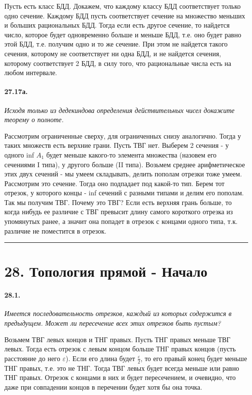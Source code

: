 \documentclass{book}
\begin{document}
Пусть есть класс БДД. Докажем, что каждому классу БДД соответствует только одно сечение. Каждому БДД пусть соответствует сечение на множество меньших и больших рациональных БДД. Тогда если есть другое сечение, то найдется число, которое будет одновременно больше и меньше БДД, т.е. оно будет равно этой БДД, т.е. получим одно и то же сечение. При этом не найдется такого сечения, которому не соответствует ни одна БДД, и не найдется сечения, которому соответствует 2 БДД, в силу того, что рациональные числа есть на любом интервале.


\paragraph{27.17а.}
\textit{Исходя только из дедекиндова определения действительных чисел докажите теорему о полноте.}

Рассмотрим ограниченные сверху, для ограниченных снизу аналогично. Тогда у таких множеств есть верхние грани. Пусть ТВГ нет. Выберем 2 сечения - у одного inf $A_1$ будет меньше какого-то элемента множества (назовем его сечениями I типа), у другого больше (II типа). Возьмем среднее арифметическое этих двух сечений - мы умеем складывать, делить пополам отрезки тоже умеем. Рассмотрим это сечение. Тогда оно подпадает под какой-то тип. Берем тот отрезок, у которого концы - inf сечений с разными типами и делим его пополам. Так мы получим ТВГ. Почему это ТВГ? Если есть верхняя грань больше, то когда нибудь ее различие с ТВГ превысит длину самого короткого отрезка  из упомянутых ранее, а значит она попадет в отрезок с концами одного типа, т.к. различие не поместится в отрезок.

\medskip\hrule\medskip


\section*{28. Топология прямой - Начало}

\paragraph{28.1.}
\textit{Имеется последовательность отрезков, каждый из которых содержится в предыдущем. Может ли пересечение всех этих отрезков быть пустым?}

Возьмем ТВГ левых концов и ТНГ правых. Пусть ТНГ правых меньше ТВГ левых. Тогда есть отрезок с левым концом больше ТНГ правых концов (пусть расстояние до него $\varepsilon$). Если его длина будет $\frac{\varepsilon}{2}$, то его правый конец будет меньше ТНГ правых, т.е. это не ТНГ. Тогда ТВГ левых будет всегда меньше или равно ТНГ правых. Отрезок с концами в них и будет пересечением, и очевидно, что даже при совпадении концов в перечении будет хотя бы она точка.
\end{document}
